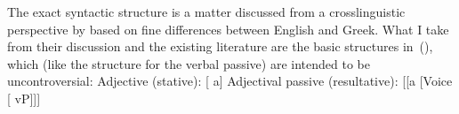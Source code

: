 %

The exact syntactic structure is a matter discussed from a crosslinguistic perspective by \cite{alexiadouetal14,layering15} based on fine differences between English and Greek. What I take from their discussion and the existing literature are the basic structures in~(\nextx), which (like the structure for the verbal passive) are intended to be uncontroversial:
\pex
	\a Adjective (stative): {[} a]
	\a Adjectival passive (resultative): {[}[a [Voice [ vP]]]
\xe

